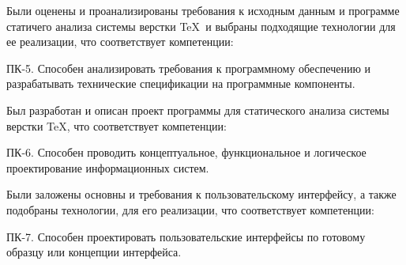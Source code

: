 Были оценены и проанализированы требования к исходным данным и программе статичего анализа системы верстки \TeX\verb| |и выбраны подходящие технологии для ее реализации, что соответствует компетенции:

ПК-5. Способен анализировать требования к программному обеспечению и разрабатывать технические спецификации на программные компоненты.

Был разработан и описан проект программы для статического анализа системы верстки \TeX, что соответствует компетенции:

ПК-6. Способен проводить концептуальное, функциональное и логическое проектирование информационных систем.

Были заложены основны и требования к пользовательскому интерфейсу, а также подобраны технологии, для его реализации, что соответствует компетенции:

ПК-7. Способен проектировать пользовательские интерфейсы по готовому образцу или концепции интерфейса.